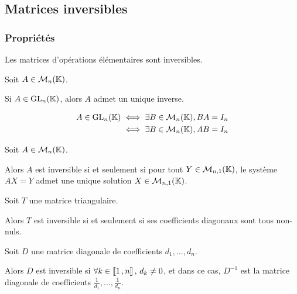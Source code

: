 \subsection{Matrices inversibles}

    \subsubsection{Propriétés}

    \begin{prop}{}{}
        Les matrices d’opérations élémentaires sont inversibles.
    \end{prop}

    \begin{prop}{}{}
        Soit $A \in \mathcal{M}_{n}(\mathbb{K})$.

        \begin{alors}
            \item Si $A \in \operatorname{GL}_n(\mathbb{K})$, alors $A$ admet un unique inverse.
            \item \begin{align*}
                A \in \operatorname{GL}_n(\mathbb{K}) & \iff \exists B \in \mathcal{M}_{n}(\mathbb{K}), BA = I_n \\
                & \iff \exists B \in \mathcal{M}_{n}(\mathbb{K}), AB = I_n 
            \end{align*}
        \end{alors}
    \end{prop}

    \begin{prop}{}{}
        Soit $A \in \mathcal{M}_{n}(\mathbb{K})$.

        Alors $A$ est inversible si et seulement si pour tout $Y \in \mathcal{M}_{n,1}(\mathbb{K})$, le système $AX = Y$ admet une unique solution $X \in \mathcal{M}_{n,1}(\mathbb{K})$.
    \end{prop}

    \begin{coro}{}{}
        Soit $T$ une matrice triangulaire. 

        Alors $T$ est inversible si et seulement si ses coefficients diagonaux sont tous non-nuls.
    \end{coro}

    \begin{coro}{}{}
        Soit $D$ une matrice diagonale de coefficients $d_1,\ldots,d_n$.

        Alors $D$ est inversible si $\forall k \in \left\llbracket 1 \, , n \right\rrbracket, \, d_k \neq 0$, et dans ce cas, $D^{-1}$ est la matrice diagonale de coefficients $\frac{1}{d_1},\ldots,\frac{1}{d_n}$.
    \end{coro}

